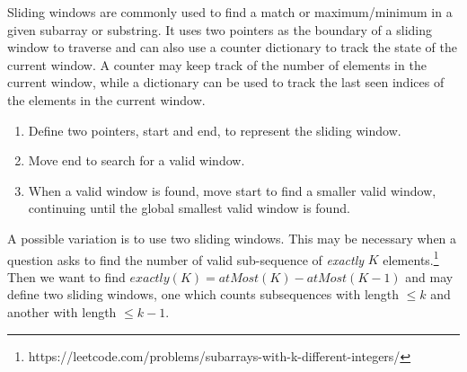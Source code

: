 \documentclass{article}
\newcommand{\comment}[1]{}
\begin{document}
    Sliding windows are commonly used to find a match or maximum/minimum in a given subarray or substring. It uses two pointers as the boundary of a sliding window to traverse and can also use a counter dictionary to track the state of the current window. A counter may keep track of the number of elements in the current window, while a dictionary can be used to track the last seen indices of the elements in the current window.
    
    \begin{enumerate}
        \item Define two pointers, start and end, to represent the sliding window.
        \item Move end to search for a valid window.
        \item When a valid window is found, move start to find a smaller valid window, continuing until the global smallest valid window is found.
    \end{enumerate}
    
    A possible variation is to use two sliding windows. This may be necessary when a question asks to find the number of valid sub-sequence of \textit{exactly} $K$ elements.\footnote{https://leetcode.com/problems/subarrays-with-k-different-integers/} Then we want to find $exactly(K) = atMost(K) - atMost(K-1)$ and may define two sliding windows, one which counts subsequences with length $\leq k$ and another with length $\leq k-1$.
    
    \comment{
    # Using monotonic double-ended queues
    def longest_valid_subarray(A, limit):
        maxdq = collections.deque()
        mindq = collections.deque()
        i = 0 
        for a in A:
            while len(maxdq) and a > maxdq[-1]: maxdq.pop()
            while len(mindq) and a < mindq[-1]: mindq.pop()
            maxdq.append(a)
            mindq.append(a)
            if maxdq[0] - mindq[0] > limit:
                if maxdq[0] == A[i]: maxdq.popleft()
                if mindq[0] == A[i]: mindq.popleft()
                i += 1
        return len(A) - i
        
    Another challenging variation involves finding the length of a window in which the absolute difference is maximized but under a given limit.\footnote{https://leetcode.com/problems/longest-continuous-subarray-with-absolute-diff-less-than-or-equal-to-limit/} In this case, we maintain two double-ended queues (deque), one of minimums that is kept monotonically increasing and the other of maximums that is kept monotonically decreasing. After appending elements on to the end of both queues while maintaining monotonic order, we then update the front of the deques so that the difference between their first elements does not exceede the given limit, incrementing a counter if we popleft. This counter corresponds to the left pointer of a sliding window and we want the max valid window.
    }
    
\end{document}

